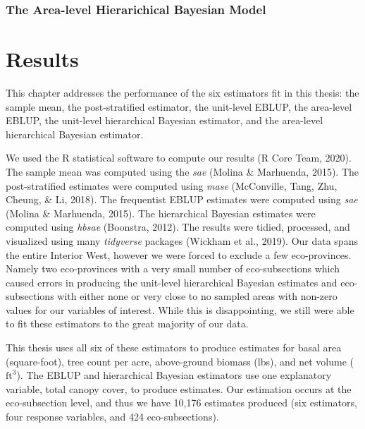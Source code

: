 \documentclass[12pt,twoside]{reedthesis}
\begin{document}
\hypertarget{the-area-level-hierarichical-bayesian-model}{%
\subsection{The Area-level Hierarichical Bayesian Model}\label{the-area-level-hierarichical-bayesian-model}}

\hypertarget{results}{%
\chapter{Results}\label{results}}

This chapter addresses the performance of the six estimators fit in this thesis: the sample mean, the post-stratified estimator, the unit-level EBLUP, the area-level EBLUP, the unit-level hierarchical Bayesian estimator, and the area-level hierarchical Bayesian estimator.

We used the R statistical software to compute our results (R Core Team, 2020). The sample mean was computed using the \emph{sae} (Molina \& Marhuenda, 2015). The post-stratified estimates were computed using \emph{mase} (McConville, Tang, Zhu, Cheung, \& Li, 2018). The frequentist EBLUP estimates were computed using \emph{sae} (Molina \& Marhuenda, 2015). The hierarchical Bayesian estimates were computed using \emph{hbsae} (Boonstra, 2012). The results were tidied, processed, and visualized using many \emph{tidyverse} packages (Wickham et al., 2019). Our data spans the entire Interior West, however we were forced to exclude a few eco-provinces. Namely two eco-provinces with a very small number of eco-subsections which caused errors in producing the unit-level hierarchical Bayesian estimates and eco-subsections with either none or very close to no sampled areas with non-zero values for our variables of interest. While this is disappointing, we still were able to fit these estimators to the great majority of our data.

This thesis uses all six of these estimators to produce estimates for basal area (square-foot), tree count per acre, above-ground biomass (lbs), and net volume (\(\text{ft}^3\)). The EBLUP and hierarchical Bayesian estimators use one explanatory variable, total canopy cover, to produce estimates. Our estimation occurs at the eco-subsection level, and thus we have 10,176 estimates produced (six estimators, four response variables, and 424 eco-subsections).
\end{document}
